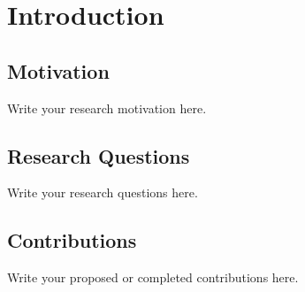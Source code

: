 \chapter{Introduction}
\section{Motivation}
Write your research motivation here.
\section{Research Questions}
Write your research questions here.
\section{Contributions}
Write your proposed or completed contributions here.
